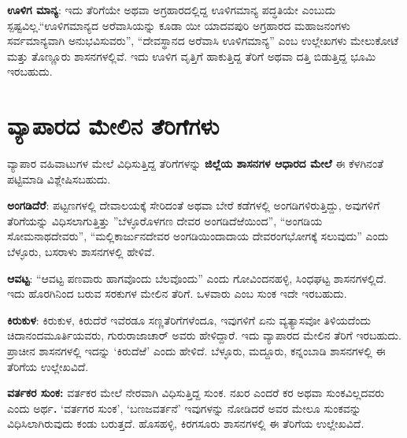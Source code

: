 \textbf{ಊಳಿಗ ಮಾನ್ಯ}: ಇದು ತೆರಿಗೆಯೇ ಅಥವಾ ಅಗ್ರಹಾರದಲ್ಲಿದ್ದ ಊಳಿಗಮಾನ್ಯ ಪದ್ಧತಿಯೇ ಎಂಬುದು ಸ್ಪಷ್ಟವಿಲ್ಲ.\break “ಊಳಿಗಮಾನ್ಯದ ಅರೆವಾಸಿಯನ್ನು ಕೂಡಾ ಯೀ ಯಾದವಪುರಿ ಅಗ್ರಹಾರದ ಮಹಾಜನಂಗಳು ಸರ್ವಮಾನ್ಯವಾಗಿ ಅನುಭವಿಸುವರು”, “ದೇವಸ್ಥಾನದ ಅರೆವಾಸಿ ಊಳಿಗಮಾನ್ಯ” ಎಂಬ ಉಲ್ಲೇಖಗಳು ಮೇಲುಕೋಟೆ ಮತ್ತು ತೊಣ್ಣೂರು ಶಾಸನಗಳಲ್ಲಿವೆ. ಇದು ಊಳಿಗ ವೃತ್ತಿಗೆ ಹಾಕುತ್ತಿದ್ದ ತೆರಿಗೆ ಅಥವಾ ದತ್ತಿ ಬಿಡುತ್ತಿದ್ದ ಭೂಮಿ ಇರಬಹುದು.

\newpage

\section{ವ್ಯಾಪಾರದ ಮೇಲಿನ ತೆರಿಗೆಗಳು}

ವ್ಯಾಪಾರ ವಹಿವಾಟುಗಳ ಮೇಲೆ ವಿಧಿಸುತ್ತಿದ್ದ ತೆರಿಗೆಗಳನ್ನು \textbf{ಜಿಲ್ಲೆಯ ಶಾಸನಗಳ ಆಧಾರದ ಮೇಲೆ} ಈ ಕೆಳಗಿನಂತೆ ಪಟ್ಟಿಮಾಡಿ ವಿಶ್ಲೇಷಿಸಬಹುದು.

\textbf{ಅಂಗಡಿದೆರೆ}: ಪಟ್ಟಣಗಳಲ್ಲಿ ದೇವಾಲಯಕ್ಕೆ ಸೇರಿದಂತೆ ಅಥವಾ ಬೇರೆ ಕಡೆಗಳಲ್ಲಿ ಅಂಗಡಿಗಳಿರುತ್ತಿದ್ದು, ಅವುಗಳಿಗೆ ತೆರಿಗೆಯನ್ನು ವಿಧಿಸಲಾಗುತ್ತಿತ್ತು ”ಬೆಳ್ಳೂರೊಳಗಣ ದೇವರ ಅಂಗಡಿದೆಱೆಯಿಂದ”, “ಅಂಗಡಿಯ ಸೋಮನಾಥದೇವರು”, “ಮಲ್ಲಿಕಾರ್ಜುನದೇವರ ಅಂಗಡಿಯಿಂದಾದಾಯ ದೇವರಂಗಭೋಗಕ್ಕೆ ಸಲುವುದು” ಎಂದು ಬೆಳ್ಳೂರು, ಬಸರಾಳು ಶಾಸನಗಳಲ್ಲಿ ಹೇಳಿವೆ.

\textbf{ಆವಟ್ಟ}: “ಆವಟ್ಟ ಪಣವಾರು ಹಾಗವೊಂದು ಬೆಲವೊಂದು” ಎಂದು ಗೋವಿಂದನಹಳ್ಳಿ, ಸಿಂಧಘಟ್ಟ ಶಾಸನಗಳ\-ಲ್ಲಿದೆ. ಇದು ಹೊರಗಿನಿಂದ ಬರುವ ಸರಕುಗಳ ಮೇಲಿನ ತೆರಿಗೆ. ಒಳವಾರು ಎಂಬ ಸುಂಕ ಇದೇ ಇರಬಹುದು.

\textbf{ಕಿರುಕುಳ}: ಕಿರುಕುಳ, ಕಿರುದೆರೆ ಇವೆರಡೂ ಸಣ್ಣತೆರಿಗೆಗಳೆಂದೂ, ಇವುಗಳಿಗೆ ಏನು ವ್ಯತ್ಯಾಸವೋ ತಿಳಿಯದೆಂದು ಚಿದಾನಂದಮೂರ್ತಿಯವರು, ಗುರುರಾಜಾಚಾರ್​ ಅವರು ಹೇಳಿದ್ದಾರೆ. ಇದು ವ್ಯಾಪಾರದ ಮೇಲಿನ ತೆರಿಗೆ ಇರಬಹುದು. ಪ್ರಾಚೀನ ಶಾಸನಗಳಲ್ಲಿ ಇದನ್ನು ‘ಕಿರುದೆಱೆ’ ಎಂದು ಹೇಳಿದೆ. ಬೆಳ್ಳೂರು, ಮದ್ದೂರು, ಕನ್ನಂಬಾಡಿ ಶಾಸನಗಳಲ್ಲಿ ಈ ತೆರಿಗೆಯ ಉಲ್ಲೇಖವಿದೆ.

\textbf{ವರ್ತಕರ ಸುಂಕ:} ವರ್ತಕರ ಮೇಲೆ ನೇರವಾಗಿ ವಿಧಿಸುತ್ತಿದ್ದ ಸುಂಕ. ನಖರ ಎಂದರೆ ಕರ ಅಥವಾ ಸುಂಕವಿಲ್ಲದವರು ಎಂದು ಅರ್ಥ\textbf{. }‘ವರ್ತಗರ ಸುಂಕ’, ‘ಬಣಜವರ್ತನೆ’ ಇವುಗಳನ್ನು ನೋಡಿದರೆ ಅವರ ಮೇಲೂ ಸುಂಕವನ್ನು ವಿಧಿಸಿಲಾಗಿರುವುದು ಕಂಡು ಬರುತ್ತದೆ. ಹೊಸಹಳ್ಳಿ, ಕಿರಗಸೂರು ಶಾಸನಗಳಲ್ಲಿ ಈ ತೆರಿಗೆಯ ಉಲ್ಲೇಖವಿದೆ.


